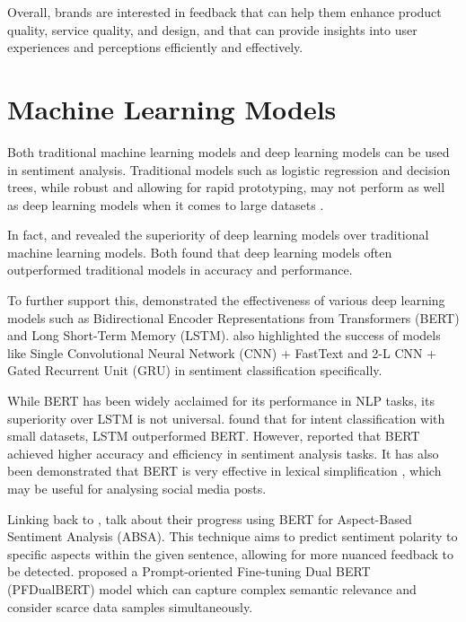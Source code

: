 Overall, brands are interested in feedback that can help them enhance product quality, service quality, and design, and that can provide insights into user experiences and perceptions efficiently and effectively.

\section{Machine Learning Models}
Both traditional machine learning models and deep learning models can be used in sentiment analysis. Traditional models such as logistic regression and decision trees, while robust and allowing for rapid prototyping, may not perform as well as deep learning models when it comes to large datasets \citep{rajnayak2017traditional}.

In fact, \citet{kansara2020comparison} and \citet{kamruzzaman2021comparative} revealed the superiority of deep learning models over traditional machine learning models. Both found that deep learning models often outperformed traditional models in accuracy and performance.

To further support this, \citet{dhola2021comparative} demonstrated the effectiveness of various deep learning models such as Bidirectional Encoder Representations from Transformers (BERT) and Long Short-Term Memory (LSTM). \citet{kamruzzaman2021comparative} also highlighted the success of models like Single Convolutional Neural Network (CNN) + FastText and 2-L CNN + Gated Recurrent Unit (GRU) in sentiment classification specifically.

While BERT has been widely acclaimed for its performance in NLP tasks, its superiority over LSTM is not universal. \citet{ezen2020comparison} found that for intent classification with small datasets, LSTM outperformed BERT. However, \citet{rangila2022sentiment} reported that BERT achieved higher accuracy and efficiency in sentiment analysis tasks. It has also been demonstrated that BERT is very effective in lexical simplification \citep{qiang2021lsbert}, which may be useful for analysing social media posts.

Linking back to \citet{d2019sentiment}, \citet{yin2023prompt} talk about their progress using BERT for Aspect-Based Sentiment Analysis (ABSA). This technique aims to predict sentiment polarity to specific aspects within the given sentence, allowing for more nuanced feedback to be detected. \citet{yin2023prompt} proposed a Prompt-oriented Fine-tuning Dual BERT (PFDualBERT) model which can capture complex semantic relevance and consider scarce data samples simultaneously.

